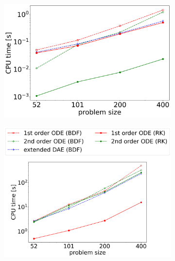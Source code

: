 \begin{figure}[H]
	\centering
	\begin{subfigure}[b]{0.32\textwidth}
		\centering
		\includegraphics[width=1\textwidth]{images/TANDEM_TimePerRHSEvaluation_differentSizes.png}
		\label{fig:scalabilty_executionTimes__timePerStep}
	\end{subfigure}
	\begin{subfigure}[b]{0.32\textwidth}
		\centering \hspace{-0.75cm}
		\includegraphics[width=1.18\textwidth]{images/TANDEM_CPU_Time_intialization.png}

\end{subfigure}
\end{figure}
